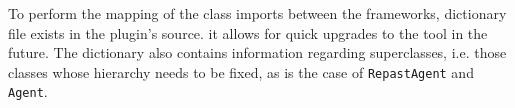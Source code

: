 To perform the mapping of the class imports between the frameworks, dictionary file exists in the plugin's source. it allows for quick upgrades to the tool in the future. The dictionary also contains information regarding superclasses, i.e. those classes whose hierarchy needs to be fixed, as is the case of \texttt{RepastAgent} and \texttt{Agent}.